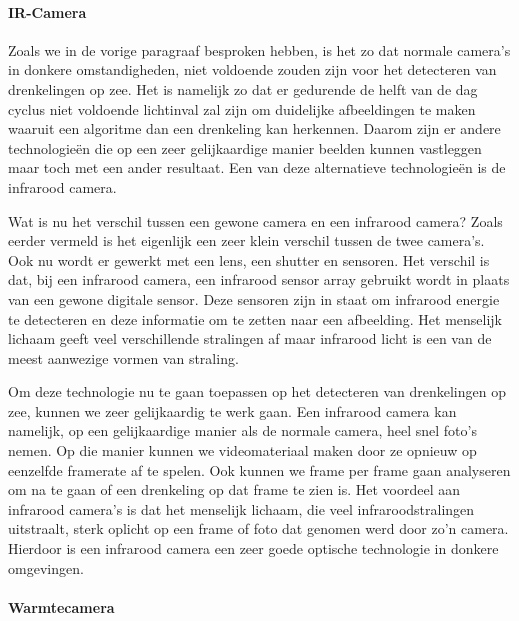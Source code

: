 \paragraph{IR-Camera}

Zoals we in de vorige paragraaf besproken hebben, is het zo dat normale camera's in donkere omstandigheden, niet voldoende zouden zijn voor het detecteren van drenkelingen op zee. Het is namelijk zo dat er gedurende de helft van de dag cyclus niet voldoende lichtinval zal zijn om duidelijke afbeeldingen te maken waaruit een algoritme dan een drenkeling kan herkennen. Daarom zijn er andere technologieën die op een zeer gelijkaardige manier beelden kunnen vastleggen maar toch met een ander resultaat. Een van deze alternatieve technologieën is de infrarood camera. 


Wat is nu het verschil tussen een gewone camera en een infrarood camera? Zoals eerder vermeld is het eigenlijk een zeer klein verschil tussen de twee camera's. Ook nu wordt er gewerkt met een lens, een shutter en sensoren. Het verschil is dat, bij een infrarood camera, een infrarood sensor array gebruikt wordt in plaats van een gewone digitale sensor. Deze sensoren zijn in staat om infrarood energie te detecteren en deze informatie om te zetten naar een afbeelding. Het menselijk lichaam geeft veel verschillende stralingen af maar infrarood licht is een van de meest aanwezige vormen van straling.


Om deze technologie nu te gaan toepassen op het detecteren van drenkelingen op zee, kunnen we zeer gelijkaardig te werk gaan. Een infrarood camera kan namelijk, op een gelijkaardige manier als de normale camera, heel snel foto's nemen. Op die manier kunnen we videomateriaal maken door ze opnieuw op eenzelfde framerate af te spelen. Ook kunnen we frame per frame gaan analyseren om na te gaan of een drenkeling op dat frame te zien is. Het voordeel aan infrarood camera's is dat het menselijk lichaam, die veel infraroodstralingen uitstraalt, sterk oplicht op een frame of foto dat genomen werd door zo'n camera. Hierdoor is een infrarood camera een zeer goede optische technologie in donkere omgevingen. 

\paragraph{Warmtecamera}

